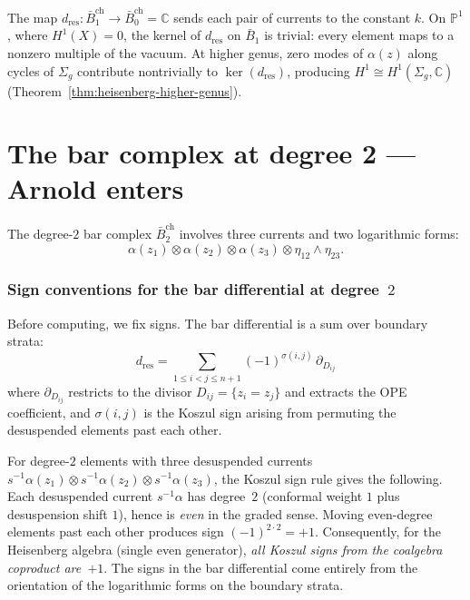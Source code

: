 \begin{remark}\label{rem:frame-ope-extraction}
The map $d_{\mathrm{res}}\colon \bar{B}^{\mathrm{ch}}_1 \to
\bar{B}^{\mathrm{ch}}_0 = \mathbb{C}$ sends each pair of currents
to the constant $k$.  On $\mathbb{P}^1$, where $H^1(X) = 0$, the
kernel of $d_{\mathrm{res}}$ on $\bar{B}_1$ is trivial: every element
maps to a nonzero multiple of the vacuum.  At higher genus, zero modes
of $\alpha(z)$ along cycles of $\Sigma_g$ contribute nontrivially to
$\ker(d_{\mathrm{res}})$, producing $H^1 \cong H^1(\Sigma_g, \mathbb{C})$
(Theorem~\ref{thm:heisenberg-higher-genus}).
\end{remark}

\section{The bar complex at degree 2 --- Arnold enters}
\label{sec:frame-bar-deg2}

The degree-$2$ bar complex $\bar{B}^{\mathrm{ch}}_2$ involves three
currents and two logarithmic forms:
\begin{equation}\label{eq:frame-bar2-element}
\alpha(z_1) \otimes \alpha(z_2) \otimes \alpha(z_3)
\otimes \eta_{12} \wedge \eta_{23}.
\end{equation}

\subsubsection*{Sign conventions for the bar differential at degree~$2$}

Before computing, we fix signs.  The bar differential is a sum over
boundary strata:
\begin{equation}\label{eq:frame-d-sum-strata}
d_{\mathrm{res}} = \sum_{1 \leq i < j \leq n+1}
  (-1)^{\sigma(i,j)}\, \partial_{D_{ij}}
\end{equation}
where $\partial_{D_{ij}}$ restricts to the divisor
$D_{ij} = \{z_i = z_j\}$ and extracts the OPE coefficient, and
$\sigma(i,j)$ is the Koszul sign arising from permuting the
desuspended elements past each other.

For degree-$2$ elements with three desuspended currents
$s^{-1}\alpha(z_1) \otimes s^{-1}\alpha(z_2) \otimes s^{-1}\alpha(z_3)$,
the Koszul sign rule gives the following.
Each desuspended current $s^{-1}\alpha$ has degree~$2$
(conformal weight $1$ plus desuspension shift $1$), hence
is \emph{even} in the graded sense.  Moving even-degree elements
past each other produces sign $(-1)^{2 \cdot 2} = +1$.
Consequently, for the Heisenberg algebra (single even generator),
\emph{all Koszul signs from the coalgebra coproduct are~$+1$}.
The signs in the bar differential come entirely from the
orientation of the logarithmic forms on the boundary strata.

